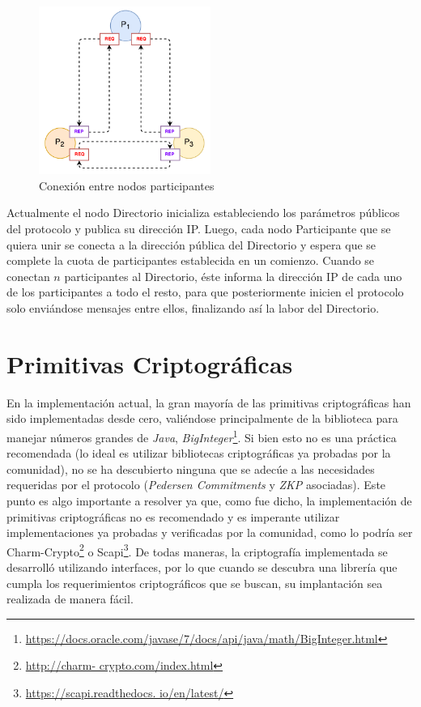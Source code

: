 \begin{figure}
  \centering
    \includegraphics[width=0.5\textwidth]{imagenes/participants_connection.pdf}
  \caption{Conexión entre nodos participantes}
\end{figure}

Actualmente el nodo Directorio inicializa estableciendo los parámetros 
públicos del protocolo y publica su dirección IP. Luego, cada nodo 
Participante que se quiera unir se conecta a la dirección pública del 
Directorio y espera que se complete la cuota de participantes establecida en 
un comienzo. Cuando se conectan $n$ participantes al Directorio, éste informa 
la dirección IP de cada uno de los participantes a todo el resto, para que 
posteriormente inicien el protocolo solo enviándose mensajes entre ellos, 
finalizando así la labor del Directorio.

\section{Primitivas Criptográficas}

En la implementación actual, la gran mayoría de las primitivas criptográficas 
han sido implementadas desde cero, valiéndose principalmente de la biblioteca 
para manejar números grandes de \emph{Java}, \emph{BigInteger}\footnote{\url{
https://docs.oracle.com/javase/7/docs/api/java/math/BigInteger.html}}. Si bien 
esto no es una práctica recomendada (lo ideal es utilizar bibliotecas 
criptográficas ya probadas por la comunidad), no se ha descubierto ninguna que 
se adecúe a las necesidades requeridas por el protocolo (\emph{Pedersen 
Commitments} y \emph{ZKP} asociadas). Este punto es algo importante a resolver 
ya que, como fue dicho, la implementación de primitivas criptográficas no es 
recomendado y es imperante utilizar implementaciones ya probadas y verificadas 
por la comunidad, como lo podría ser Charm-Crypto\footnote{\url{http://charm-
crypto.com/index.html}} o Scapi\footnote{\url{https://scapi.readthedocs.
io/en/latest/}}. De todas maneras, la criptografía implementada se desarrolló 
utilizando interfaces, por lo que cuando se descubra una librería que cumpla 
los requerimientos criptográficos que se buscan, su implantación sea realizada 
de manera fácil.

